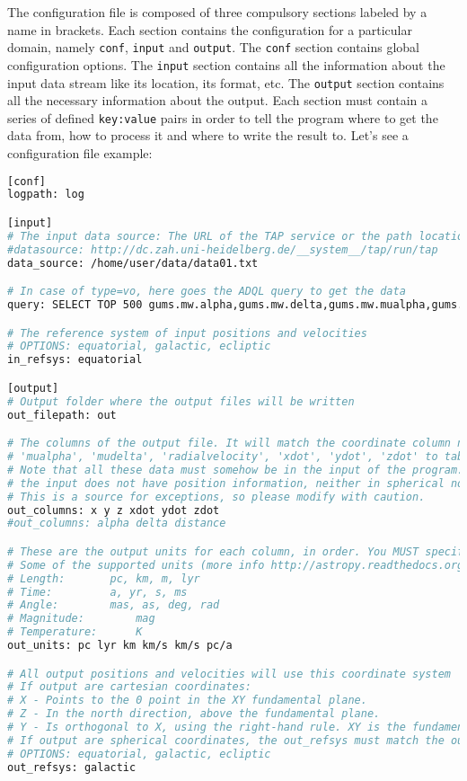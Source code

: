 \documentclass[
a4paper, %
11pt, %
onecolumn, %
openany, %
]{memoir}
\begin{document}
The configuration file is composed of three compulsory sections labeled by a name in brackets. Each
section contains the configuration for a particular domain, namely \texttt{conf}, \texttt{input} and
\texttt{output}. The \texttt{conf} section contains global configuration options. The \texttt{input}
section contains all the information about the input data stream like its location, its format, etc. The \texttt{output}
section contains all the necessary information about the output.
Each section must contain a series of defined \texttt{key:value} pairs in order
to tell the program where to get the data from, how to process it and where to write the result to.
Let's see a configuration file example:

\begin{lstlisting}[language=bash,basicstyle={\tiny\ttfamily}]
[conf]
logpath: log

[input]
# The input data source: The URL of the TAP service or the path location of the input file
#datasource: http://dc.zah.uni-heidelberg.de/__system__/tap/run/tap
data_source: /home/user/data/data01.txt

# In case of type=vo, here goes the ADQL query to get the data
query: SELECT TOP 500 gums.mw.alpha,gums.mw.delta,gums.mw.mualpha,gums.mw.mudelta FROM gums.mw

# The reference system of input positions and velocities
# OPTIONS: equatorial, galactic, ecliptic
in_refsys: equatorial

[output]
# Output folder where the output files will be written
out_filepath: out

# The columns of the output file. It will match the coordinate column names such as 'alpha', 'delta', 'distance', 'x', 'y', 'z', 
# 'mualpha', 'mudelta', 'radialvelocity', 'xdot', 'ydot', 'zdot' to table column names, so that it knows when to transform coordinates.
# Note that all these data must somehow be in the input of the program. One can not make up data, one can only transform it, so if
# the input does not have position information, neither in spherical nor cartesian coordinates, the output can not have it either.
# This is a source for exceptions, so please modify with caution.
out_columns: x y z xdot ydot zdot
#out_columns: alpha delta distance

# These are the output units for each column, in order. You MUST specify these, there's no way around.
# Some of the supported units (more info http://astropy.readthedocs.org/en/latest/units/#module-astropy.units.cds):
# Length: 		pc, km, m, lyr
# Time: 		a, yr, s, ms
# Angle: 		mas, as, deg, rad
# Magnitude: 		mag
# Temperature: 		K
out_units: pc lyr km km/s km/s pc/a

# All output positions and velocities will use this coordinate system
# If output are cartesian coordinates:
# X - Points to the 0 point in the XY fundamental plane.
# Z - In the north direction, above the fundamental plane.
# Y - Is orthogonal to X, using the right-hand rule. XY is the fundamental plane.
# If output are spherical coordinates, the out_refsys must match the out_columns names.
# OPTIONS: equatorial, galactic, ecliptic
out_refsys: galactic
\end{lstlisting}
\end{document}
